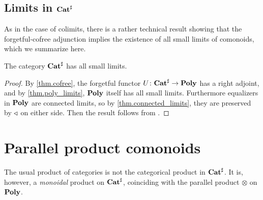 \documentclass[Book-Poly]{subfiles}
\begin{document}
\subsection{Limits in $\mathbf{Cat}^\sharp$}

As in the case of colimits, there is a rather technical result showing that the forgetful-cofree adjunction implies the existence of all small limits of comonoids, which we summarize here.

\begin{corollary}
The category $\mathbf{Cat}^\sharp$ has all small limits.
\end{corollary}
\begin{proof}
By \cref{thm.cofree}, the forgetful functor $U\colon\mathbf{Cat}^\sharp\to\mathbf{Poly}$ has a right adjoint, and by \cref{thm.poly_limits}, $\mathbf{Poly}$ itself has all small limits.
Furthermore equalizers in $\mathbf{Poly}$ are connected limits, so by \cref{thm.connected_limits}, they are preserved by $\mathbin{\triangleleft}$ on either side.
Then the result follows from \cite[Fact~3.4]{porst2019colimits}.
\end{proof}


\section{Parallel product comonoids}

The usual product of categories is not the categorical product in $\mathbf{Cat}^\sharp$. %
It is, however, a \emph{monoidal} product on $\mathbf{Cat}^\sharp$, coinciding with the parallel product $\otimes$ on $\mathbf{Poly}$.
\end{document}
